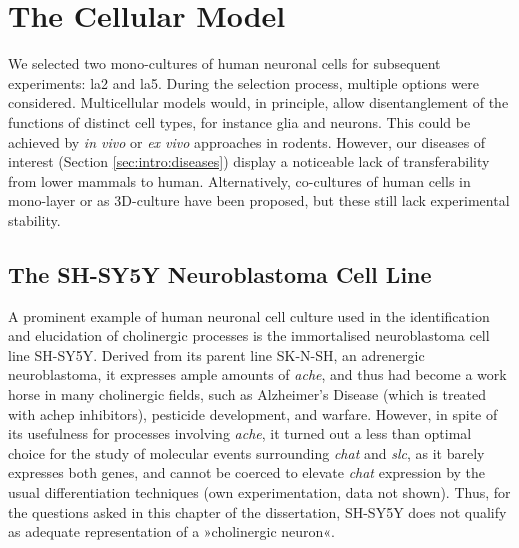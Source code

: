 \section{The Cellular Model} \label{sec:cellculture:model}
We selected two mono-cultures of human neuronal cells for subsequent experiments: \acs{la2} and \acs{la5}. During the selection process, multiple options were considered. Multicellular models would, in principle, allow disentanglement of the functions of distinct cell types, for instance glia and neurons. This could be achieved by \emph{in vivo} or \emph{ex vivo} approaches in rodents. However, our diseases of interest (Section \ref{sec:intro:diseases}) display a noticeable lack of transferability from lower mammals to human.\cite{} Alternatively, co-cultures of human cells in mono-layer or as 3D-culture have been proposed, but these still lack experimental stability.

\subsection{The SH-SY5Y Neuroblastoma Cell Line}
A prominent example of human neuronal cell culture used in the identification and elucidation of cholinergic processes is the immortalised neuroblastoma cell line SH-SY5Y.\cite{Biedler1978} Derived from its parent line SK-N-SH, an adrenergic neuroblastoma,\cite{Biedler1973} it expresses ample amounts of \textit{\ac{ache}}, and thus had become a work horse in many cholinergic fields, such as Alzheimer's Disease (which is treated with \ac{achep} inhibitors), pesticide development, and warfare.\cite{} However, in spite of its usefulness for processes involving \textit{\ac{ache}}, it turned out a less than optimal choice for the study of molecular events surrounding \textit{\ac{chat}} and \textit{\ac{slc}}, as it barely expresses both genes,\cite{} and cannot be coerced to elevate \textit{\ac{chat}} expression by the usual differentiation techniques (own experimentation, data not shown). Thus, for the questions asked in this chapter of the dissertation, SH-SY5Y does not qualify as adequate representation of a »cholinergic neuron«.

